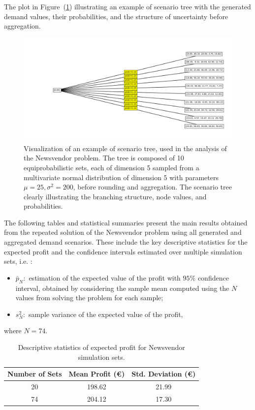 \documentclass[a4paper,12pt]{article}
\begin{document}
	
	\noindent The plot in Figure~(\ref{fig:scenariotree-plot}) illustrating an example of scenario tree  with the generated demand values, their probabilities, and the structure of uncertainty before aggregation.
	\begin{figure}[H]
		\includegraphics[width=1\textwidth]{../immagini/scenariNV.png}
		\caption{Visualization of an example of scenario tree, used in the analysis of the Newsvendor problem. The tree is composed of 10 equiprobabilistic sets, each of dimension 5 sampled from a multivariate normal distribution of dimension 5 with parameters $\mu = 25, \sigma^{2} = 200$, before rounding and aggregation. The scenario tree clearly illustrating the branching structure, node values, and probabilities. }
		\label{fig:scenariotree-plot}
	\end{figure}
	
	\noindent
	The following tables and statistical summaries present the main results obtained from the repeated solution of the Newsvendor problem using all generated and aggregated demand scenarios. These include the key descriptive statistics for the expected profit and the confidence intervals estimated over multiple simulation sets, i.e. :
	\begin{itemize}
		\item $\bar{p}_{N}:$ estimation of the expected value of the profit with $95\%$ confidence interval, obtained by considering the sample mean computed using the $N$ values from solving the problem for each sample; 
		\item $s^{2}_{N}:$ sample variance of the expected value of the profit,
	\end{itemize}
	
	\noindent where $N = 74.$
	
	\begin{table}[H]
		\centering
			\begin{tabular}{|c|c|c|}
			\hline
			\textbf{Number of Sets} & \textbf{Mean Profit (€)} & \textbf{Std. Deviation (€)} \\
			\hline
			20 & 198.62 & 21.99 \\
			74 & 204.12 & 17.30 \\
			\hline
		\end{tabular}
		\caption{Descriptive statistics of expected profit for Newsvendor simulation sets.}
		
		\label{tab:profit-descriptive}
	\end{table}
	
\end{document}
